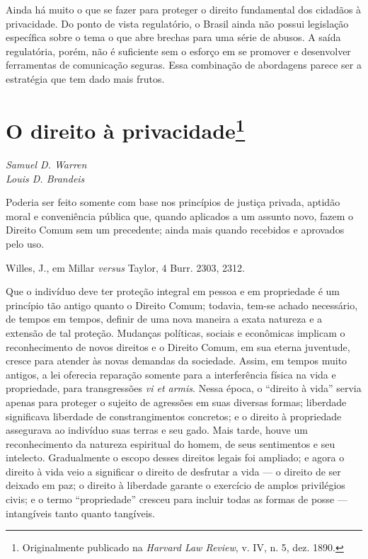 Ainda há muito o que se fazer para proteger o direito fundamental dos
cidadãos à privacidade. Do ponto de vista regulatório, o Brasil ainda
não possui legislação específica sobre o tema o que abre brechas para
uma série de abusos. A saída regulatória, porém, não é suficiente sem o
esforço em se promover e desenvolver ferramentas de comunicação seguras.
Essa combinação de abordagens parece ser a estratégia que tem dado mais
frutos.

\chapter{O direito à privacidade\footnote{Originalmente publicado na \emph{Harvard
  Law Review}, v. IV, n. 5, dez. 1890.}}\label{o-direito-uxe0-privacidade}

\begin{flushright}
\emph{Samuel D. Warren\\
Louis D. Brandeis}
\end{flushright}

\epigraph{Poderia ser feito somente com base nos princípios de justiça privada,
aptidão moral e conveniência pública que, quando aplicados a um assunto
novo, fazem o Direito Comum sem um precedente; ainda mais quando
recebidos e aprovados pelo uso.}{Willes, J., em Millar \emph{versus} Taylor, 4 Burr. 2303, 2312.}

Que o indivíduo deve ter proteção integral em pessoa e em propriedade é
um princípio tão antigo quanto o Direito Comum; todavia, tem-se achado
necessário, de tempos em tempos, definir de uma nova maneira a exata
natureza e a extensão de tal proteção. Mudanças políticas, sociais e
econômicas implicam o reconhecimento de novos direitos e o Direito
Comum, em sua eterna juventude, cresce para atender às novas demandas da
sociedade. Assim, em tempos muito antigos, a lei oferecia reparação
somente para a interferência física na vida e propriedade, para
transgressões \emph{vi et armis}. Nessa época, o ``direito à vida''
servia apenas para proteger o sujeito de agressões em suas diversas
formas; liberdade significava liberdade de constrangimentos concretos; e
o direito à propriedade assegurava ao indivíduo suas terras e seu gado.
Mais tarde, houve um reconhecimento da natureza espiritual do homem, de
seus sentimentos e seu intelecto. Gradualmente o escopo desses direitos
legais foi ampliado; e agora o direito à vida veio a significar o
direito de desfrutar a vida --- o direito de ser deixado em paz; o
direito à liberdade garante o exercício de amplos privilégios civis; e o
termo ``propriedade'' cresceu para incluir todas as formas de posse ---
intangíveis tanto quanto tangíveis.

